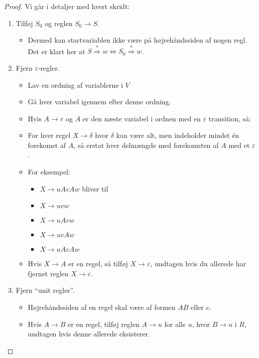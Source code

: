 \begin{proof}
	Vi går i detaljer med hvert skridt:
	\begin{enumerate}
		\item Tilføj $S_{0}$ og reglen $S_{0} \rightarrow S$.
		      \begin{itemize}
			      \item Dermed kan startvariablen ikke være på højrehåndssiden af nogen regl. Det er klart her at $S \stackrel{*}{\Rightarrow} w \iff S_{0} \stackrel{*}{\Rightarrow} w$.
		      \end{itemize}
		\item Fjern $\varepsilon$-regler.
		      \begin{itemize}
			      \item Lav en ordning af variablerne i $V$
			      \item Gå hver variabel igennem efter denne ordning.
			      \item Hvis $A \rightarrow \varepsilon$ og $A$ er den næste variabel i ordnen med en $\varepsilon$ transition, så:
			      \item For hver regel $X \rightarrow \delta$ hvor $\delta$ kan være alt, men indeholder mindst én forekomst af $A$, så erstat hver delmængde med forekomsten af $A$ med et \(\varepsilon\).
			      \item For eksempel:
			            \begin{itemize}
				            \item $X \rightarrow uAvAw$ bliver til
				            \item $X \rightarrow uvw$
				            \item $X \rightarrow uAvw$
				            \item $X \rightarrow uvAw$
				            \item $X \rightarrow uAvAw$
			            \end{itemize}
			      \item Hvis $X \rightarrow A$ er en regel, så tilføj $X \rightarrow \varepsilon$, undtagen hvis du allerede har fjernet reglen $X \rightarrow \varepsilon$.
		      \end{itemize}
		\item Fjern ``unit regler''.
		      \begin{itemize}
			      \item Højrehåndssiden af en regel skal være af formen $AB$ eller $c$.
			      \item Hvis $A \rightarrow B$ er en regel, tilføj reglen $A \rightarrow u$ for alle $u$, hvor $B \rightarrow u$ i $R$, undtagen hvis denne allerede eksisterer.

\end{itemize}
\end{enumerate}
\end{proof}
